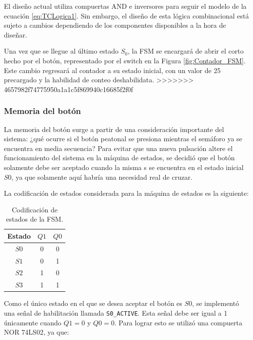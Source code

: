 \documentclass[12pt,onecolumn]{IEEEtran}
\begin{document}
El diseño actual utiliza compuertas AND e inversores para seguir el modelo de la ecuación \ref{eq:TCLogica1}. Sin embargo, el diseño de esta lógica combinacional está sujeto a cambios dependiendo de los componentes disponibles a la hora de diseñar.

Una vez que se llegue al último estado $S_0$, la FSM se encargará de abrir el corto hecho por el botón, representado por el switch en la Figura \ref{fig:Contador_FSM}. Este cambio regresará al contador a su estado inicial, con un valor de 25 precargado y la habilidad de conteo deshabilidata.
>>>>>>> 4657982f74775950a1a1c5f869940c16685f2f0f

\subsubsection{Memoria del botón}

La memoria del botón surge a partir de una consideración importante del sistema: ¿qué ocurre si el botón peatonal se presiona mientras el semáforo ya se encuentra en media secuencia? Para evitar que una nueva pulsación altere el funcionamiento del sistema en la máquina de estados, se decidió que el botón solamente debe ser aceptado cuando la misma s se encuentra en el estado inicial $S0$, ya que solamente aquí habría una necesidad real de cruzar.

La codificación de estados considerada para la máquina de estados es la siguiente:

\begin{table}[H]
    \centering
    \caption{Codificación de estados de la FSM.}
    \begin{tabular}{|c|c|c|}
        \hline
        Estado & $Q1$ & $Q0$ \\
        \hline
        $S0$ & 0 & 0 \\
        \hline
        $S1$ & 0 & 1 \\
        \hline
        $S2$ & 1 & 0 \\
        \hline
        $S3$ & 1 & 1 \\
        \hline
    \end{tabular}
    \label{tab:codificacion_fsm}
\end{table}

Como el único estado en el que se desea aceptar el botón es $S0$, se implementó una señal de habilitación llamada \texttt{S0\_ACTIVE}. Esta señal debe ser igual a 1 únicamente cuando $Q1=0$ y $Q0=0$. Para lograr esto se utilizó una compuerta NOR 74LS02, ya que:
\end{document}
